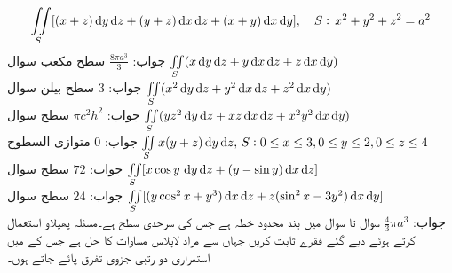 \begin{align*}\iint\limits_S [(x+z)\dif y \dif z+(y+z)\dif x\dif z+(x+y)\dif x\dif y],\quad S:\, x^2+y^2+z^2=a^2\end{align*}
جواب:\quad
$\tfrac{8\pi a^3}{3}$
\quad سطح مکعب سوال \quad 
$\iint\limits_S (x\dif y \dif z+y\dif x\dif z+z\dif x\dif y)$\\
جواب:\quad
$3$
\quad سطح بیلن سوال \quad 
$\iint\limits_S (x^2\dif y \dif z+y^2\dif x\dif z+z^2\dif x\dif y)$\\
جواب:\quad
$\pi c^2h^2$
\quad سطح سوال \quad
$\iint\limits_S (yz^2\dif y \dif z+xz\dif x\dif z+x^2y^2\dif x\dif y)$\\
جواب:\quad
$0$
\quad متوازی السطوح
$\iint\limits_S x(y+z)\dif y \dif z,\, S:0\le x \le 3, 0\le y \le 2,0\le z \le 4\,\,$\\
جواب:\quad
$72$
\quad سطح سوال 
$\iint\limits_S [x\cos y\,\dif y \dif z+(y-\sin y)\dif x\dif z]\,\,$\\
جواب:\quad
$24$
\quad سطح سوال 
$\iint\limits_S [(y\cos^2 x+y^3)\dif x\dif z+z(\sin^2 x-3y^2)\dif x\dif y]$\\
جواب:\quad
$\tfrac{4}{3}\pi a^3$
سوال  تا سوال  میں  بند محدود خطہ ہے جس کی سرحدی سطح  ہے۔مسئلہ پھیلاو استعمال کرتے ہوئے دیے  گئے فقرے ثابت کریں جہاں  سے مراد لاپلاس مساوات کا حل ہے جس کے  میں استمراری دو رتبی جزوی تفرق پائے جاتے ہوں۔

